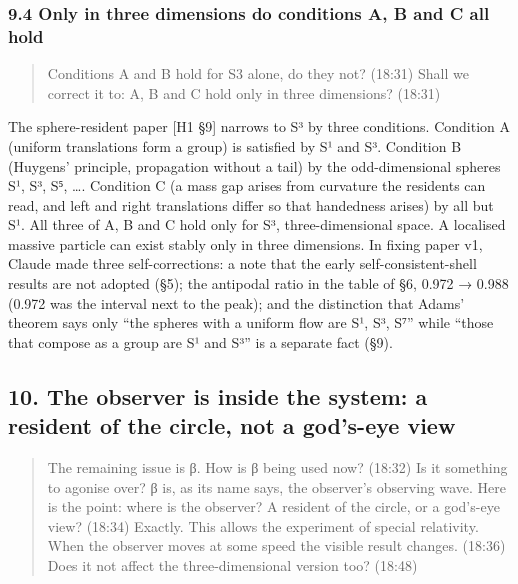 \documentclass[
  a4paper,
]{article}
\begin{document}
\subsubsection{9.4 Only in three dimensions do conditions A, B and C all
hold}\label{only-in-three-dimensions-do-conditions-a-b-and-c-all-hold}

\begin{quote}
Conditions A and B hold for S3 alone, do they not? (18:31) Shall we
correct it to: A, B and C hold only in three dimensions? (18:31)
\end{quote}

The sphere-resident paper {[}H1 §9{]} narrows to S³ by three conditions.
Condition A (uniform translations form a group) is satisfied by S¹ and
S³. Condition B (Huygens' principle, propagation without a tail) by the
odd-dimensional spheres S¹, S³, S⁵, \ldots. Condition C (a mass gap
arises from curvature the residents can read, and left and right
translations differ so that handedness arises) by all but S¹. All three
of A, B and C hold only for S³, three-dimensional space. A localised
massive particle can exist stably only in three dimensions. In fixing
paper v1, Claude made three self-corrections: a note that the early
self-consistent-shell results are not adopted (§5); the antipodal ratio
in the table of §6, 0.972 → 0.988 (0.972 was the interval next to the
peak); and the distinction that Adams' theorem says only ``the spheres
with a uniform flow are S¹, S³, S⁷'' while ``those that compose as a
group are S¹ and S³'' is a separate fact (§9).

\subsection{10. The observer is inside the system: a resident of the
circle, not a god's-eye
view}\label{the-observer-is-inside-the-system-a-resident-of-the-circle-not-a-gods-eye-view}

\begin{quote}
The remaining issue is β. How is β being used now? (18:32) Is it
something to agonise over? β is, as its name says, the observer's
observing wave. Here is the point: where is the observer? A resident of
the circle, or a god's-eye view? (18:34) Exactly. This allows the
experiment of special relativity. When the observer moves at some speed
the visible result changes. (18:36) Does it not affect the
three-dimensional version too? (18:48)
\end{quote}
\end{document}
